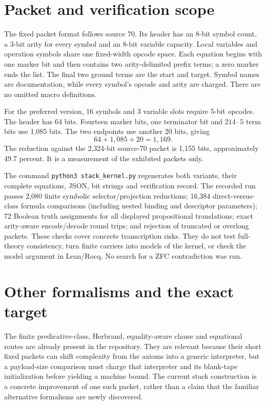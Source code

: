 \documentclass[11pt]{article}
\begin{document}
\section{Packet and verification scope}

The fixed packet format follows source 70. Its header has an 8-bit symbol count, a 3-bit arity for every symbol and an 8-bit variable capacity. Local variables and operation symbols share one fixed-width opcode space. Each equation begins with one marker bit and then contains two arity-delimited prefix terms; a zero marker ends the list. The final two ground terms are the start and target. Symbol names are documentation, while every symbol's opcode and arity are charged. There are no omitted macro definitions.

For the preferred version, 16 symbols and 3 variable slots require 5-bit opcodes. The header has 64 bits. Fourteen marker bits, one terminator bit and $214\cdot5$ term bits use 1,085 bits. The two endpoints use another 20 bits, giving
\[
 64+1,085+20=1,169.
\]
The reduction against the 2,324-bit source-70 packet is 1,155 bits, approximately 49.7 percent. It is a measurement of the exhibited packets only.

The command \texttt{python3 stack\_kernel.py} regenerates both variants, their complete equations, JSON, bit strings and verification record. The recorded run passes 2,080 finite symbolic selector/projection reductions; 16,384 direct-versus-class formula comparisons (including nested binding and descriptor parameters); 72 Boolean truth assignments for all displayed propositional translations; exact arity-aware encode/decode round trips; and rejection of truncated or overlong packets. These checks cover concrete transcription risks. They do not test full-theory consistency, turn finite carriers into models of the kernel, or check the model argument in Lean/Rocq. No search for a ZFC contradiction was run.

\section{Other formalisms and the exact target}

The finite predicative-class, Herbrand, equality-aware clause and equational routes are already present in the repository. They are relevant because their short fixed packets can shift complexity from the axioms into a generic interpreter, but a payload-size comparison must charge that interpreter and its blank-tape initialization before yielding a machine bound. The current stack construction is a concrete improvement of one such packet, rather than a claim that the familiar alternative formalisms are newly discovered.
\end{document}
